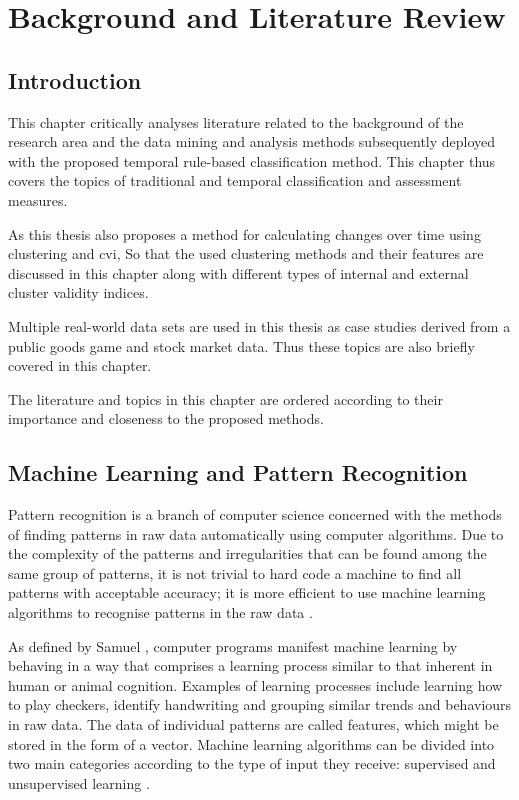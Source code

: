 
\chapter{Background and Literature Review}
\label{Chap:Background}

\section{Introduction}

This chapter critically analyses literature related to the background of the research area and the data mining and analysis methods subsequently deployed with the proposed temporal rule-based classification method. This chapter thus covers the topics of traditional and temporal classification and assessment measures.

As this thesis also proposes a method for calculating changes over time using clustering and \acrfull{cvi}, So that the used clustering methods and their features are discussed in this chapter along with different types of internal and external cluster validity indices.

Multiple real-world data sets are used in this thesis as case studies derived from a public goods game and stock market data. Thus these topics are also briefly covered in this chapter.

The literature and topics in this chapter are ordered according to their importance and closeness to the proposed methods.


\section{Machine Learning and Pattern Recognition}

Pattern recognition is a branch of computer science concerned with the methods of finding patterns in raw data automatically using computer algorithms. Due to the complexity of the patterns and irregularities that can be found among the same group of patterns, it is not trivial to hard code a machine to find all patterns with acceptable accuracy; it is more efficient to use machine learning algorithms to recognise patterns in the raw data \cite{Bishop2006}.

As defined by Samuel \cite{Samuel1959}, computer programs manifest machine learning by behaving in a way that comprises a learning process similar to that inherent in human or animal cognition. Examples of learning processes include learning how to play checkers, identify handwriting and grouping similar trends and behaviours in raw data. The data of individual patterns are called features, which might be stored in the form of a vector. Machine learning algorithms can be divided into two main categories according to the type of input they receive: supervised and unsupervised learning \cite{Bishop2006}.

